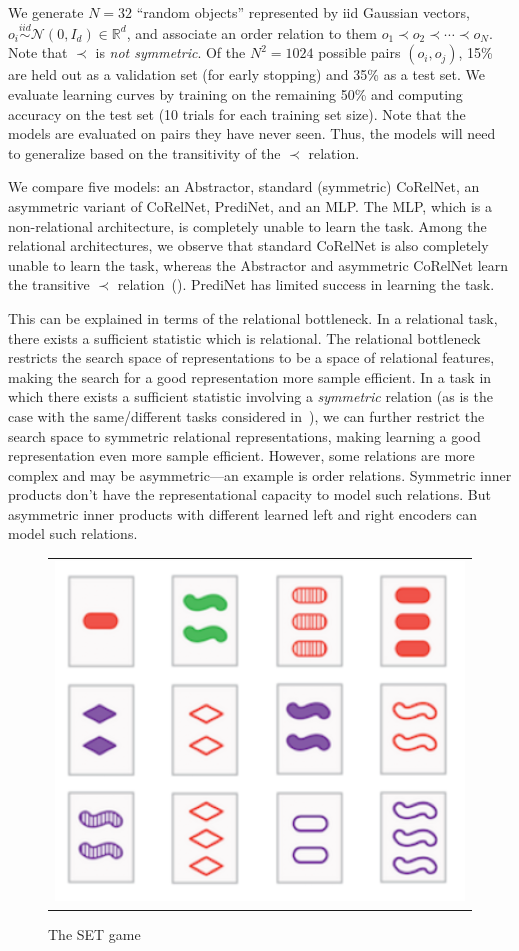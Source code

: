 We generate $N = 32$ ``random objects'' represented by iid Gaussian vectors, $o_i \overset{iid}{\sim} \mathcal{N}(0,
I_d) \in \mathbb{R}^d$, and associate an order relation to them $o_1 \prec o_2 \prec \cdots \prec o_N$. Note that $\prec$ is \textit{not symmetric}. Of the $N^2 = 1024$ possible pairs $(o_i, o_j)$, 15\% are held out as a validation set (for early stopping) and 35\% as a test set. We evaluate learning curves by training on the remaining 50\% and computing accuracy on the test set (10 trials for each training set size). Note that the models are evaluated on pairs they have never seen. Thus, the models will need to generalize based on the transitivity of the $\prec$ relation.

We compare five models: an Abstractor, standard (symmetric) CoRelNet, an asymmetric variant of CoRelNet, PrediNet, and an MLP. The MLP, which is a non-relational architecture, is completely unable to learn the task. Among the relational architectures, we observe that standard CoRelNet is also completely unable to learn the task, whereas the Abstractor and asymmetric CoRelNet learn the transitive $\prec$ relation~(). PrediNet has limited success in learning the task.

This can be explained in terms of the relational bottleneck. In a relational task, there exists a sufficient statistic which is relational. The relational bottleneck restricts the search space of representations to be a space of relational features, making the search for a good representation more sample efficient. In a task in which there exists a sufficient statistic involving a \textit{symmetric} relation (as is the case with the same/different tasks considered in~\citep{kerg2022neural}), we can further restrict the search space to symmetric relational representations, making learning a good representation even more sample efficient.
However, some relations are more complex and may be asymmetric---an example is order relations. Symmetric inner products don't have the representational capacity to model such relations. But asymmetric inner products with different learned left and right encoders can model such relations.



\begin{figure}
	\vskip-5pt
	\begin{tabular}{c}
		\includegraphics[width=.25\textwidth]{figures/set_example}\\[-5pt]
	\end{tabular}
	\caption{\footnotesize The SET game}\label{fig:set_example}
\end{figure}
